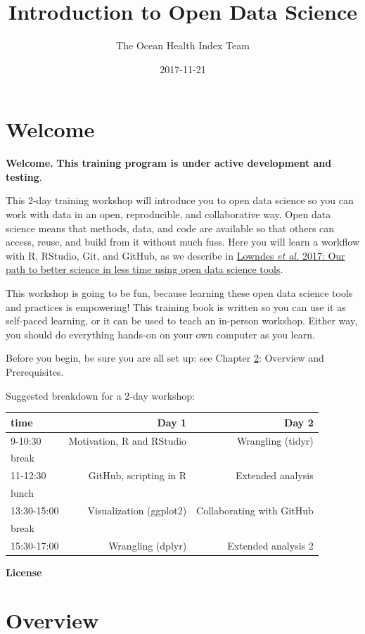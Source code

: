 \documentclass[]{book}
\title{Introduction to Open Data Science}
\author{The Ocean Health Index Team}
\date{2017-11-21}
\theoremstyle{definition}
\theoremstyle{definition}
\theoremstyle{definition}
\theoremstyle{remark}
\begin{document}
\maketitle

{
\setcounter{tocdepth}{1}
\tableofcontents
}
\chapter{Welcome}\label{welcome}

\textbf{Welcome.} \textbf{This training program is under active
development and testing}.

This 2-day training workshop will introduce you to open data science so
you can work with data in an open, reproducible, and collaborative way.
Open data science means that methods, data, and code are available so
that others can access, reuse, and build from it without much fuss. Here
you will learn a workflow with R, RStudio, Git, and GitHub, as we
describe in
\href{https://www.nature.com/articles/s41559-017-0160}{Lowndes \emph{et
al.} 2017: Our path to better science in less time using open data
science tools}.

This workshop is going to be fun, because learning these open data
science tools and practices is empowering! This training book is written
so you can use it as self-paced learning, or it can be used to teach an
in-person workshop. Either way, you should do everything hands-on on
your own computer as you learn.

Before you begin, be sure you are all set up: see Chapter
\ref{overview}: Overview and Prerequisites.

Suggested breakdown for a 2-day workshop:

\begin{longtable}[]{@{}lrr@{}}
\toprule
time & Day 1 & Day 2\tabularnewline
\midrule
\endhead
9-10:30 & Motivation, R and RStudio & Wrangling (tidyr)\tabularnewline
break & &\tabularnewline
11-12:30 & GitHub, scripting in R & Extended analysis\tabularnewline
lunch & &\tabularnewline
13:30-15:00 & Visualization (ggplot2) & Collaborating with
GitHub\tabularnewline
break & &\tabularnewline
15:30-17:00 & Wrangling (dplyr) & Extended analysis 2\tabularnewline
\bottomrule
\end{longtable}

\textbf{License}

\chapter{Overview}\label{overview}
\end{document}
